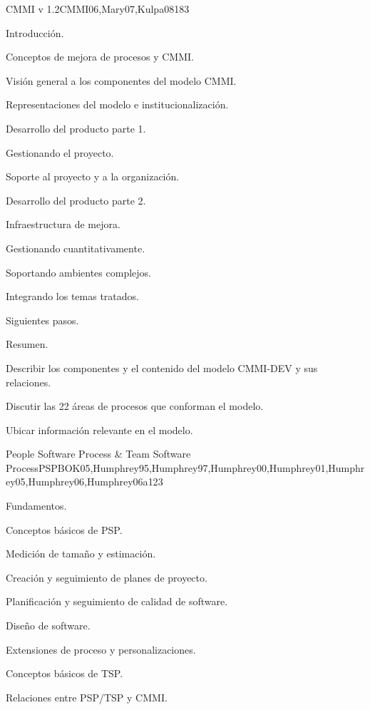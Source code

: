 \begin{syllabus}
\begin{unit}{CMMI v 1.2}{CMMI06,Mary07,Kulpa08}{18}{3}
   \begin{topics}
      \item Introducción.
      \item Conceptos de mejora de procesos y CMMI.
      \item Visión general a los componentes del modelo CMMI.
      \item Representaciones del modelo e institucionalización.
      \item Desarrollo del producto parte 1.
      \item Gestionando el proyecto.
      \item Soporte al proyecto y a la organización.
      \item Desarrollo del producto parte 2.
      \item Infraestructura de mejora.
      \item Gestionando cuantitativamente.
      \item Soportando ambientes complejos.
      \item Integrando los temas tratados.
      \item Siguientes pasos.
      \item Resumen.
   \end{topics}

   \begin{unitgoals}
      \item Describir los componentes y el contenido del modelo CMMI-DEV y sus relaciones.
      \item Discutir las 22 áreas de procesos que conforman el modelo.
      \item Ubicar información relevante en el modelo.   
   \end{unitgoals}
\end{unit}

\begin{unit}{People Software Process \& Team Software Process}{PSPBOK05,Humphrey95,Humphrey97,Humphrey00,Humphrey01,Humphrey05,Humphrey06,Humphrey06a}{12}{3}
\begin{topics}
      \item Fundamentos.
      \item Conceptos básicos de PSP.
      \item Medición de tamaño y estimación.
      \item Creación y seguimiento de planes de proyecto.
      \item Planificación y seguimiento de calidad de software.
      \item Diseño de software.
      \item Extensiones de proceso y personalizaciones.
      \item Conceptos básicos de TSP.
      \item Relaciones entre PSP/TSP y CMMI.
   \end{topics}


\end{unit}
\end{syllabus}
